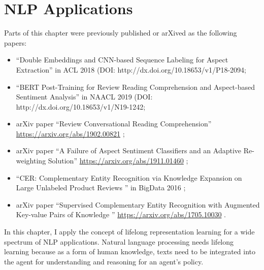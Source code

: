 \chapter{NLP Applications}
\label{chap6:nlp}

Parts of this chapter were previously published or arXived as the following papers:
\begin{itemize}
\item ``Double Embeddings and CNN-based Sequence Labeling for Aspect Extraction'' in ACL 2018 \cite{xu_acl2018} (DOI: http://dx.doi.org/10.18653/v1/P18-2094;\\ %
\item ``BERT Post-Training for Review Reading Comprehension and Aspect-based Sentiment Analysis'' in NAACL 2019 \cite{xu2019bert} (DOI: http://dx.doi.org/10.18653/v1/N19-1242;\\ %
\item arXiv paper ``Review Conversational Reading Comprehension'' \url{https://arxiv.org/abs/1902.00821} \cite{xu2019review};\\
\item arXiv paper ``A Failure of Aspect Sentiment Classifiers and an Adaptive Re-weighting Solution'' \url{https://arxiv.org/abs/1911.01460} \cite{xu2019afailure};\\
\item ``CER: Complementary Entity Recognition via Knowledge Expansion on Large Unlabeled Product Reviews
'' in BigData 2016 \cite{xu2016CER};\\%
\item arXiv paper ``Supervised Complementary Entity Recognition with Augmented Key-value Pairs of Knowledge
'' \url{https://arxiv.org/abs/1705.10030} \cite{xu2017supervised}.
\end{itemize}

In this chapter, I apply the concept of lifelong representation learning for a wide spectrum of NLP applications.
Natural language processing needs lifelong learning because as a form of human knowledge, texts need to be integrated into the agent for understanding and reasoning for an agent's policy.


